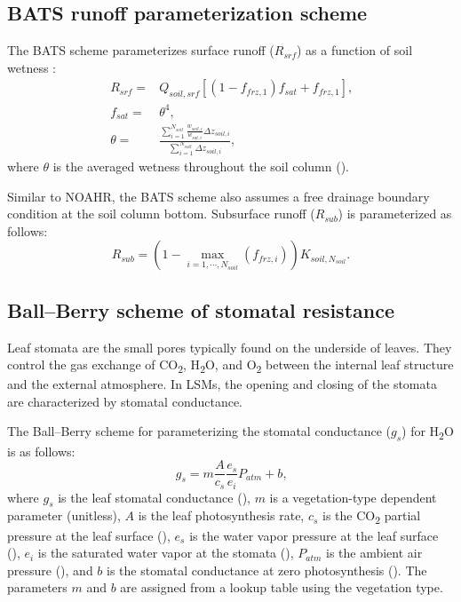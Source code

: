 \documentclass[essd, manuscript]{copernicus}
\let\unit\undefined
\begin{document}
\subsection{BATS runoff parameterization scheme}\label{sec:app:noahmp:bats}

The BATS scheme parameterizes surface runoff (\(R_{srf}\)) as a function of soil wetness \citep{yang1996GPC}:
\begin{align}
  R_{srf} = & Q_{soil,srf} \left[ (1 - f_{frz,1}) f_{sat} + f_{frz,1} \right]
  \text{,} \\
  f_{sat} = & \theta^4
  \text{,} \\
  \theta =  & \frac{\sum_{i=1}^{N_{soil}}\frac{w_{soil,i}}{w_{sat,i}}\Delta
  z_{soil,i}}
  {\sum_{i=1}^{N_{soil}}\Delta z_{soil,i}}
  \text{,}
\end{align}
where \(\theta\) is the averaged wetness throughout the soil column (\unit{m^3.m^{-3}}).

Similar to NOAHR, the BATS scheme also assumes a free drainage boundary condition at the soil column bottom. Subsurface runoff (\(R_{sub}\)) is parameterized as follows:
\begin{equation}
  R_{sub} = \left(1 - \max_{i=1,\cdots,N_{soil}}(f_{frz,i})\right) K_{soil,N_{soil}}
  \text{.}
\end{equation}

\subsection{Ball--Berry scheme of stomatal resistance}\label{sec:app:noahmp:ballberry}

Leaf stomata are the small pores typically found on the underside of leaves. They control the gas exchange of CO\textsubscript{2}, H\textsubscript{2}O, and O\textsubscript{2} between the internal leaf structure and the external atmosphere. In LSMs, the opening and closing of the stomata are characterized by stomatal conductance.

The Ball--Berry scheme for parameterizing the stomatal conductance (\(g_{s}\)) for H\textsubscript{2}O is as follows:
\begin{equation}
  g_{s}   = m \frac{A}{c_{s}} \frac{e_{s}}{e_{i}} P_{atm} + b
  \text{,}
\end{equation}
where \(g_{s}\) is the leaf stomatal conductance (\unit{\mu mol.m^{-2}.s^{-1}}), \(m\) is a vegetation-type dependent parameter (unitless), \(A\) is the leaf photosynthesis rate, \(c_{s}\) is the CO\textsubscript{2} partial pressure at the leaf surface (\unit{Pa}), \(e_{s}\) is the water vapor pressure at the leaf surface (\unit{Pa}), \(e_{i}\) is the saturated water vapor at the stomata (\unit{Pa}), \(P_{atm}\) is the ambient air pressure (\unit{Pa}), and \(b\) is the stomatal conductance at zero photosynthesis (\unit{\mu mol.m^{-2}.s^{-1}}). The parameters \(m\) and \(b\) are assigned from a lookup table using the vegetation type.
\end{document}
